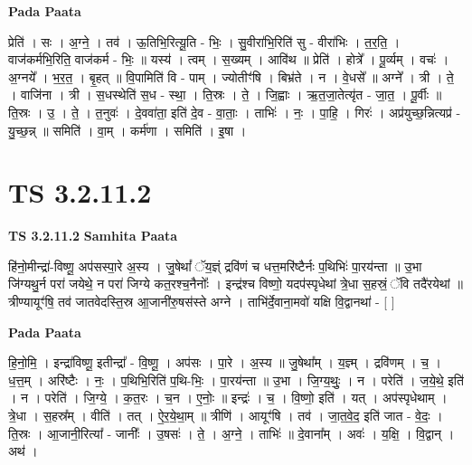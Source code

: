 \documentclass[17pt]{extarticle}
\begin{document}
\textbf{Pada Paata} \newline

प्रेति॑ । सः । अ॒ग्ने॒ । तव॑ । ऊ॒तिभि॒रित्यू॒ति - भिः॒ । सु॒वीरा॑भि॒रिति॑ सु - वीरा॑भिः । त॒र॒ति॒ । वाज॑कर्मभि॒रिति॒ वाज॑कर्म - भिः॒ ॥ यस्य॑ । त्वम् । स॒ख्यम् । आवि॑थ ॥ प्रेति॑ । होत्रे᳚ । पू॒र्व्यम् । वचः॑ । अ॒ग्नये᳚ । भ॒र॒त॒ । बृ॒हत् ॥ वि॒पामिति॑ वि - पाम् । ज्योतीꣳ॑षि । बिभ्र॑ते । न । वे॒धसे᳚ ॥ अग्ने᳚ । त्री । ते॒ । वाजि॑ना । त्री । स॒धस्थेति॑ स॒ध - स्था॒ । ति॒स्रः । ते॒ । जि॒ह्वाः । ऋ॒त॒जा॒तेत्यृ॑त - जा॒त॒ । पू॒र्वीः ॥ ति॒स्रः । उ॒ । ते॒ । त॒नुवः॑ । दे॒ववा॑ता॒ इति॑ दे॒व - वा॒ताः॒ । ताभिः॑ । नः॒ । पा॒हि॒ । गिरः॑ । अप्र॑युच्छ॒न्नित्यप्र॑ - यु॒च्छ॒न्न् ॥ समिति॑ । वा॒म् । कर्म॑णा । समिति॑ । इ॒षा ।  \newline





\section{ TS 3.2.11.2 }

\textbf{TS 3.2.11.2 } \newline
\textbf{Samhita Paata} \newline

हि॑नो॒मीन्द्रा॑-विष्णू॒ अप॑सस्पा॒रे अ॒स्य । जु॒षेथां᳚ ॅय॒ज्ञ्ं द्रवि॑णं च धत्त॒मरि॑ष्टैर्नः प॒थिभिः॑ पा॒रय॑न्ता ॥ उ॒भा जि॑ग्यथु॒र्न परा॑ जयेथे॒ न परा॑ जिग्ये कत॒रश्च॒नैनोः᳚ । इन्द्र॑श्च विष्णो॒ यदप॑स्पृधेथां त्रे॒धा स॒हस्रं॒ ॅवि तदै॑रयेथां ॥ त्रीण्यायूꣳ॑षि॒ तव॑ जातवेदस्ति॒स्र आ॒जानी॑रु॒षस॑स्ते अग्ने । ताभि॑र्दे॒वाना॒मवो॑ यक्षि वि॒द्वानथा॑ - [  ] \newline

\textbf{Pada Paata} \newline

हि॒नो॒मि॒ । इन्द्रा॑विष्णू॒ इतीन्द्रा᳚ - वि॒ष्णू॒ । अप॑सः । पा॒रे । अ॒स्य ॥ जु॒षेथा᳚म् । य॒ज्ञ्म् । द्रवि॑णम् । च॒ । ध॒त्त॒म् । अरि॑ष्टैः । नः॒ । प॒थिभि॒रिति॑ प॒थि-भिः॒ । पा॒रय॑न्ता ॥ उ॒भा । जि॒ग्य॒थुः॒ । न । परेति॑ । ज॒ये॒थे॒ इति॑ । न । परेति॑ । जि॒ग्ये॒ । क॒त॒रः । च॒न । ए॒नोः॒ ॥ इन्द्रः॑ । च॒ । वि॒ष्णो॒ इति॑ । यत् । अप॑स्पृधेथाम् । त्रे॒धा । स॒हस्र᳚म् । वीति॑ । तत् । ऐ॒र॒ये॒था॒म् ॥ त्रीणि॑ । आयूꣳ॑षि । तव॑ । जा॒त॒वे॒द॒ इति॑ जात - वे॒दः॒ । ति॒स्रः । आ॒जानी॒रित्या᳚ - जानीः᳚ । उ॒षसः॑ । ते॒ । अ॒ग्ने॒ । ताभिः॑ ॥ दे॒वाना᳚म् । अवः॑ । य॒क्षि॒ । वि॒द्वान् । अथ॑ ।  \newline
\end{document}

